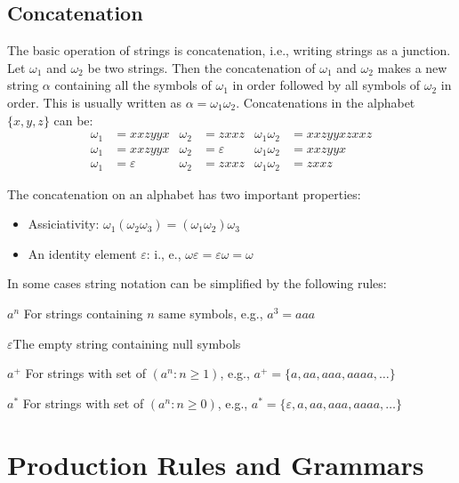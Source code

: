 \subsection{Concatenation}
The basic operation of strings is concatenation, i.e., writing strings as a junction. Let $\omega_1$ and $\omega_2$ be two strings. Then the concatenation of $\omega_1$ and $\omega_2$ makes a new string $\alpha$ containing all the symbols of $\omega_1$ in order followed by all symbols of $\omega_2$ in order. This is usually written as $\alpha=\omega_1\omega_2$.
Concatenations in the alphabet $\{x, y, z\}$ can be:
\begin{align*}
\omega_1&=xxzyyx	& \omega_2&=zxxz	& \omega_1\omega_2&=xxzyyxzxxz\\
\omega_1&=xxzyyx	& \omega_2&=\varepsilon	& \omega_1\omega_2&=xxzyyx\\
\omega_1&=\varepsilon	& \omega_2&=zxxz	& \omega_1\omega_2&=zxxz
\end{align*}

The concatenation on an alphabet has two important properties:

\begin{itemize}
	\item Assiciativity: $\omega_1(\omega_2\omega_3)=(\omega_1\omega_2)\omega_3$
	\item An identity element $\varepsilon$: i., e., $\omega\varepsilon = \varepsilon\omega = \omega$
\end{itemize}

In some cases string notation can be simplified by the following rules: 

$a^n$ \qquad For strings containing $n$ same symbols, e.g., $a^3=aaa$

$\varepsilon$\qquad\quad The empty string containing null symbols

$a^+$ \qquad For strings with set of $(a^n:n\geq1)$, e.g., $a^+=\{a, aa, aaa, aaaa, \ldots\}$

$a^*$ \qquad For strings with set of $(a^n:n\geq0)$, e.g., $a^*=\{\varepsilon, a, aa, aaa, aaaa, \ldots\}$
 
\section{Production Rules and Grammars}
